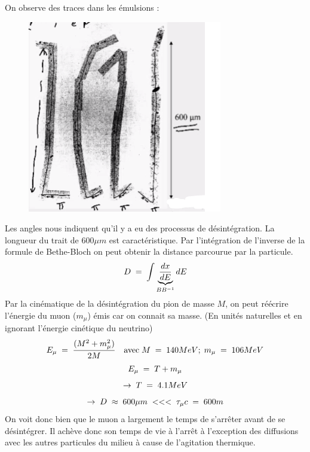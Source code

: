 On observe des traces dans les émulsions :
\begin{figure}[H]
    \centering
    \includegraphics{Images4/traces.png}
\end{figure}
Les angles nous indiquent qu'il y a eu des processus de désintégration. La longueur du trait de $600\mu m$ est caractéristique. Par l'intégration de l'inverse de la formule de Bethe-Bloch on peut obtenir la distance parcourue par la particule.
\begin{equation*}
    D\; = \; \int \underbrace{\dfrac{dx}{dE}}_{BB^{-1}} dE
\end{equation*}
Par la cinématique de la désintégration du pion de masse $M$, on peut réécrire l'énergie du muon ($m_\mu$) émis car on connait sa masse. (En unités naturelles et en ignorant l'énergie cinétique du neutrino)
\begin{equation*}
    E_\mu \; = \; \dfrac{(M^2 + m_\mu^2)}{2M}\quad \text{avec} \; M \; = \; 140MeV; \; m_\mu \; = \; 106MeV
\end{equation*}
\begin{equation*}
    E_\mu \; = \; T + m_\mu
\end{equation*}
\begin{equation*}
    \rightarrow\;T\; = \; 4.1MeV
\end{equation*}
\begin{equation*}
    \rightarrow \; D \; \approx \; 600\mu m \; <<< \; \tau_\mu c \; = \; 600m
\end{equation*}
On voit donc bien que le muon a largement le temps de s'arrêter avant de se désintégrer. Il achève donc son temps de vie à l'arrêt à l'exception des diffusions avec les autres particules du milieu à cause de l'agitation thermique.\\

